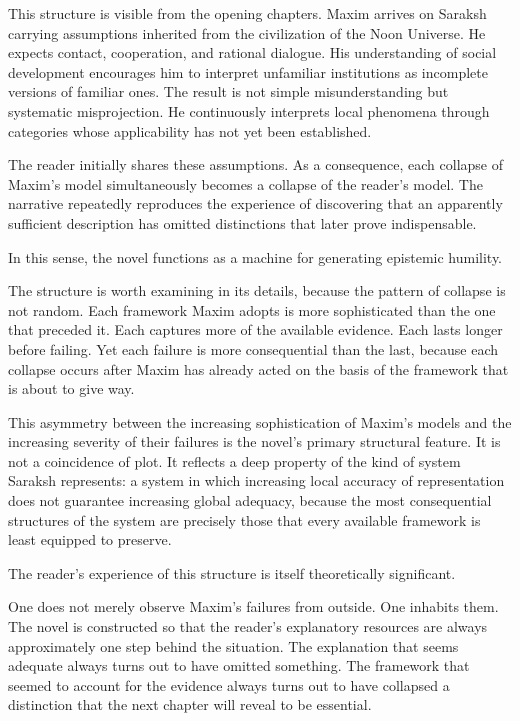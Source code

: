 \documentclass[12pt, a4paper]{article}
\theoremstyle{plain}
\theoremstyle{definition}
\theoremstyle{remark}
\begin{document}
This structure is visible from the opening chapters.
Maxim arrives on Saraksh carrying assumptions inherited
from the civilization of the Noon Universe. He expects
contact, cooperation, and rational dialogue. His
understanding of social development encourages him to
interpret unfamiliar institutions as incomplete versions
of familiar ones. The result is not simple
misunderstanding but systematic misprojection. He
continuously interprets local phenomena through
categories whose applicability has not yet been
established.

The reader initially shares these assumptions. As a
consequence, each collapse of Maxim's model
simultaneously becomes a collapse of the reader's model.
The narrative repeatedly reproduces the experience of
discovering that an apparently sufficient description
has omitted distinctions that later prove indispensable.

In this sense, the novel functions as a machine for
generating epistemic humility.

The structure is worth examining in its details, because
the pattern of collapse is not random. Each framework
Maxim adopts is more sophisticated than the one that
preceded it. Each captures more of the available
evidence. Each lasts longer before failing. Yet each
failure is more consequential than the last, because
each collapse occurs after Maxim has already acted on
the basis of the framework that is about to give way.

This asymmetry between the increasing sophistication
of Maxim's models and the increasing severity of their
failures is the novel's primary structural feature.
It is not a coincidence of plot. It reflects a deep
property of the kind of system Saraksh represents:
a system in which increasing local accuracy of
representation does not guarantee increasing global
adequacy, because the most consequential structures
of the system are precisely those that every available
framework is least equipped to preserve.

The reader's experience of this structure is itself
theoretically significant.

One does not merely observe Maxim's failures from
outside. One inhabits them. The novel is constructed
so that the reader's explanatory resources are always
approximately one step behind the situation. The
explanation that seems adequate always turns out to
have omitted something. The framework that seemed to
account for the evidence always turns out to have
collapsed a distinction that the next chapter will
reveal to be essential.
\end{document}

